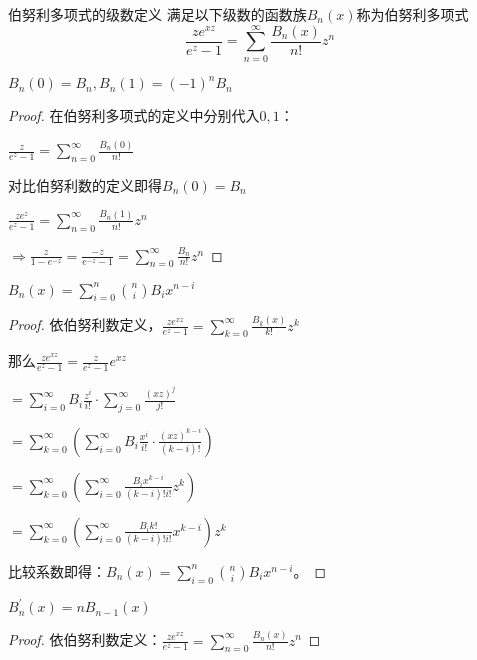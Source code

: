 \documentclass[12pt, a4paper, oneside, UTF8]{ctexbook}
\begin{document}
		\begin{para}{0}
			\begin{defn}{伯努利多项式的级数定义}{}
				满足以下级数的函数族$B_n(x)$称为伯努利多项式
				\begin{equation}
					\frac{z e^{xz}}{e^z-1}=\sum\limits_{n=0}^{\infty} \frac{B_n(x)}{n!}z^n
				\end{equation}
			\end{defn}
			\begin{para}{1}
				\point{}
					\begin{proposition}
						$B_n(0)=B_n,B_n(1)=(-1)^{n}B_n$
					\end{proposition}
					\begin{proof}
						 在伯努利多项式的定义中分别代入$0,1$：
						 
						 $\frac{z}{e^z-1}=\sum\limits_{n=0}^{\infty} \frac{B_n(0)}{n!}$
						 
						 对比伯努利数的定义即得$B_n(0) = B_n$
						 
						 $\frac{z e^z}{e^z-1}=\sum\limits_{n=0}^{\infty} \frac{B_n(1)}{n!}z^n$
						 
						 $\Rightarrow\frac{z}{1-e^{-z}}=\frac{-z}{e^{-z}-1} = \sum\limits_{n=0}^{\infty} \frac{B_n}{n!}z^n$
					\end{proof}
				\point{}
					\begin{proposition}
						$B_n(x) = \sum\limits_{i=0}^{n} \binom{n}{i}B_i x^{n-i}$
					\end{proposition}
					\begin{proof}
						依伯努利数定义，$\frac{z e^{xz}}{e^z-1}=\sum\limits_{k=0}^{\infty} \frac{B_k(x)}{k!}z^k$
						
						那么$\frac{z e^{xz}}{e^z-1}=\frac{z}{e^z-1} e^{xz}$
						
						$=\sum\limits_{i=0}^{\infty} B_i \frac{z^i}{i!} \cdot \sum\limits_{j=0}^{\infty} \frac{(xz)^j}{j!}$
						
						$=\sum\limits_{k=0}^{\infty} \left(\sum\limits_{i=0}^{\infty} B_i \frac{x^i}{i!}\cdot \frac{(xz)^{k-i}}{(k-i)!}\right)$
						
						$=\sum\limits_{k=0}^{\infty} \left(\sum\limits_{i=0}^{\infty} \frac{B_i x^{k-i}}{(k-i)!i!}z^k\right)$
						
						$=\sum\limits_{k=0}^{\infty} \left(\sum\limits_{i=0}^{\infty} \frac{B_i k!}{(k-i)!i!}x^{k-i}\right) z^k$
						
						比较系数即得：$B_n(x) = \sum\limits_{i=0}^{n} \binom{n}{i}B_i x^{n-i}$。
					\end{proof}
				\point{}
					\begin{proposition}
						$B_n^{\prime} (x) = n B_{n-1} (x)$
					\end{proposition}
					\begin{proof}
						依伯努利数定义：$\frac{z e^{xz}}{e^z-1} = \sum\limits_{n=0}^{\infty} \frac{B_n(x)}{n!}z^n$
						

\end{proof}
\end{para}
\end{para}
\end{document}
